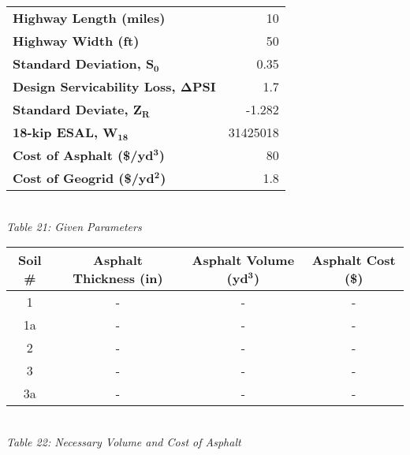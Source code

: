 \documentclass{article}
\begin{document}
\begin{center}
    \newpage
    \begin{tabular}{|l|r|}
        \hline
        \textbf{Highway Length (miles)}                               & 10  \\
        \textbf{Highway Width (ft)}                                      & 50  \\
        \textbf{Standard Deviation, $\bm{S_0}$}                   & 0.35  \\
        \textbf{Design Servicability Loss, $\bm{\Delta PSI}$}                            & 1.7  \\
        \textbf{Standard Deviate, $\bm{Z_R}$}                               & -1.282  \\
        \textbf{18-kip ESAL, $\bm{W_{18}}$}                            & 31425018  \\
        \textbf{Cost of Asphalt (\$/yd$\bm{^3}$)}                     & 80  \\
        \textbf{Cost of Geogrid (\$/yd$\bm{^2}$)}                 & 1.8 \\\hline
    \end{tabular}
    \vspace{3mm}
    \emph{\\Table 21: Given Parameters\\}
    \vspace{7mm}
    \begin{tabular}{|c|ccc|}
        \hline
        \textbf{Soil \#} & \textbf{Asphalt Thickness (in)} & \textbf{Asphalt Volume (yd$\bm{^3}$)} & \textbf{Asphalt Cost (\$)}  \\\hline
        1       & -                      & -                        & -                  \\
        1a      & -                      & -                         & -                  \\
        2       & -                      & -                         & -                  \\
        3       & -                      & -                         & -                  \\
        3a      & -                      & -                        & -                   \\\hline
    \end{tabular}
    \vspace{3mm}
    \emph{\\Table 22: Necessary Volume and Cost of Asphalt\\}

\end{center}
\end{document}

